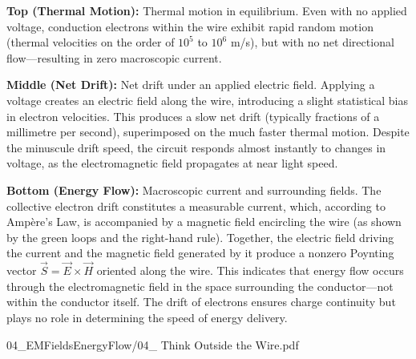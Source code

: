 \begin{SideNotePage}{
  \textbf{Top (Thermal Motion):} Thermal motion in equilibrium. Even with no applied voltage, conduction electrons within the wire exhibit rapid random motion (thermal velocities on the order of $10^5$ to $10^6$ m/s), but with no net directional flow—resulting in zero macroscopic current. \par
  \textbf{Middle (Net Drift):} Net drift under an applied electric field. Applying a voltage creates an electric field along the wire, introducing a slight statistical bias in electron velocities. This produces a slow net drift (typically fractions of a millimetre per second), superimposed on the much faster thermal motion. Despite the minuscule drift speed, the circuit responds almost instantly to changes in voltage, as the electromagnetic field propagates at near light speed. \par
  \textbf{Bottom (Energy Flow):} Macroscopic current and surrounding fields. The collective electron drift constitutes a measurable current, which, according to Ampère’s Law, is accompanied by a magnetic field encircling the wire (as shown by the green loops and the right-hand rule). Together, the electric field driving the current and the magnetic field generated by it produce a nonzero Poynting vector $\vec{S} = \vec{E} \times \vec{H}$ oriented along the wire. This indicates that energy flow occurs through the electromagnetic field in the space surrounding the conductor—not within the conductor itself. The drift of electrons ensures charge continuity but plays no role in determining the speed of energy delivery. \par
}{04_EMFieldsEnergyFlow/04_ Think Outside the Wire.pdf}
\end{SideNotePage}
